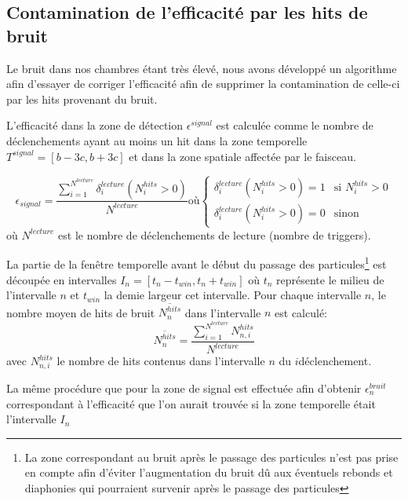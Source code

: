 \subsection{Contamination de l'efficacité par les hits de bruit}

Le bruit dans nos chambres étant très élevé, nous avons développé un algorithme afin d'essayer de corriger l'efficacité afin de supprimer la contamination de celle-ci par les hits provenant du bruit.

L'efficacité dans la zone de détection $\epsilon^{signal}$ est calculée comme le nombre de déclenchements ayant au moins un hit dans la zone temporelle $T^{signal}=\left[b-3c,b+3c\right]$ et dans la zone spatiale affectée par le faisceau.

\begin{equation}
\epsilon_{signal}=\frac{\sum\limits_{i=1}^{N^{lecture}} \delta^{lecture}_i(N^{hits}_{i}>0)}{N^{lecture}} \mbox{où}
\left\{
\begin{array}{ll}
\delta^{lecture}_i(N^{hits}_{i}>0)=1 & \mbox{si } N^{hits}_{i}>0 \\
\delta^{lecture}_i(N^{hits}_{i}>0)=0 & \mbox{sinon}
\end{array}
\right.
\end{equation}
où $N^{lecture}$ est le nombre de déclenchements de lecture (nombre de triggers).

La partie de la fenêtre temporelle avant le début du passage des particules\footnote{La zone correspondant au bruit après le passage des particules n'est pas prise en compte afin d'éviter l'augmentation du bruit dû aux éventuels rebonds et diaphonies qui pourraient survenir après le passage des particules} est découpée en intervalles $I_{n}=\left[t_{n}-t_{win},t_{n}+t_{win}\right]$ où $t_{n}$ représente le milieu de l'intervalle $n$ et $t_{win}$ la demie largeur cet intervalle. Pour chaque intervalle $n$, le nombre moyen de hits de bruit $\overline{N^{hits}_n}$ dans l'intervalle $n$ est calculé:
\begin{equation}
\overline{N^{hits}_n}=\frac{\sum\limits_{i=1}^{N^{lecture}} N^{hits}_{n,i}}{N^{lecture}}
\end{equation}
avec $N^{hits}_{n,i}$ le nombre de hits contenus dans l'intervalle $n$ du $i$\ieme déclenchement.

La même procédure que pour la zone de signal est effectuée afin d'obtenir $\epsilon^{bruit}_n$ correspondant à l'efficacité que l'on aurait trouvée si la zone temporelle était l'intervalle $I_{n}$


